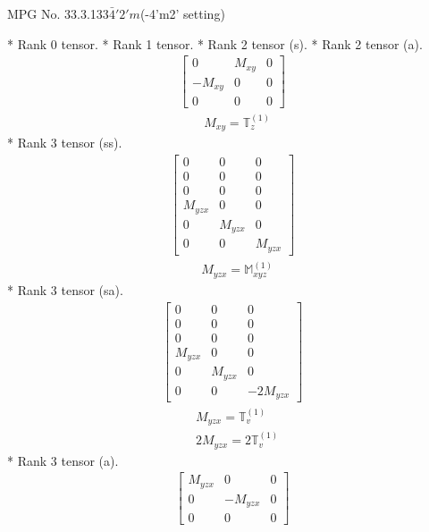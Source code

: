 \documentclass[fleqn,8pt,landscape]{jsarticle}
\begin{document}
\setcounter{MaxMatrixCols}{32}

\renewcommand{\tablename}{Table~}
\renewcommand{\figurename}{Figure~}
\begin{center}
\LARGE
MPG No. 33.3.133\quad$\bar{4}'2'm$\quad(-4'm2' setting)
\end{center}
* Rank 0 tensor.
* Rank 1 tensor.
* Rank 2 tensor (s).
* Rank 2 tensor (a).
\begin{align*}
\begin{bmatrix} 0 & M_{xy} & 0 \\ - M_{xy} & 0 & 0 \\ 0 & 0 & 0 \end{bmatrix}
\end{align*}
\begin{align*}
& M_{xy} = \mathbb{T}_{z}^{(1)}
\end{align*}
* Rank 3 tensor (ss).
\begin{align*}
\begin{bmatrix} 0 & 0 & 0 \\ 0 & 0 & 0 \\ 0 & 0 & 0 \\ M_{yzx} & 0 & 0 \\ 0 & M_{yzx} & 0 \\ 0 & 0 & M_{yzx} \end{bmatrix}
\end{align*}
\begin{align*}
& M_{yzx} = \mathbb{M}_{xyz}^{(1)}
\end{align*}
* Rank 3 tensor (sa).
\begin{align*}
\begin{bmatrix} 0 & 0 & 0 \\ 0 & 0 & 0 \\ 0 & 0 & 0 \\ M_{yzx} & 0 & 0 \\ 0 & M_{yzx} & 0 \\ 0 & 0 & - 2 M_{yzx} \end{bmatrix}
\end{align*}
\begin{align*}
& M_{yzx} = \mathbb{T}_{v}^{(1)} \\
& 2 M_{yzx} = 2 \mathbb{T}_{v}^{(1)}
\end{align*}
* Rank 3 tensor (a).
\begin{align*}
\begin{bmatrix} M_{yzx} & 0 & 0 \\ 0 & - M_{yzx} & 0 \\ 0 & 0 & 0 \end{bmatrix}
\end{align*}
\end{document}
